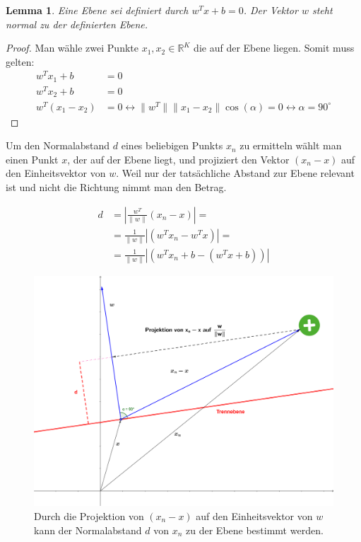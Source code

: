 \documentclass[a4paper,11pt,twoside]{scrreprt}
\newtheorem{lemma}[theorem]{Lemma}
\newcommand{\norm}[1]{\lVert#1\rVert}
\begin{document}
\begin{lemma}
	Eine Ebene sei definiert durch $w^{T} x + b = 0$. Der Vektor $w$ steht normal zu der definierten Ebene.
\end{lemma}

\begin{proof}
	Man wähle zwei Punkte $x_{1}, x_{2} \in \mathbb{R}^{K}$ die auf der Ebene liegen. Somit muss gelten:
	\begin{equation}
		\begin{aligned}
			w^{T} x_{1} + b &= 0 \\
			w^{T} x_{2} + b &= 0 \\
			w^{T} (x_{1} - x_{2}) &= 0 \leftrightarrow \norm{w^{T}} \norm{x_{1} - x_{2}} \cos(\alpha) = 0 \leftrightarrow \alpha = 90^{\circ}
		\end{aligned}
	\end{equation}
\end{proof}

Um den Normalabstand $d$ eines beliebigen Punkts $x_{n}$ zu ermitteln wählt man einen Punkt $x$, der auf der Ebene liegt, und projiziert den Vektor $(x_{n} - x)$ auf den Einheitsvektor von $w$. Weil nur der tatsächliche Abstand zur Ebene relevant ist und nicht die Richtung nimmt man den Betrag.

\begin{equation} \label{distance_to_plane}
	\begin{aligned}
		d &= | \frac{w^{T}}{\lVert w \rVert} (x_{n} - x) | = \\
		&= \frac{1}{\norm{w}} | (w^{T} x_{n} - w^{T} x) | =\\
		&= \frac{1}{\norm{w}} | (w^{T} x_{n} + b - (w^{T} x + b)) |
	\end{aligned}
\end{equation}

\begin{figure}[H]
	\centering
	\includegraphics[width = 13cm]{assets/projection.png}
	\caption{Durch die Projektion von $(x_{n} - x)$ auf den Einheitsvektor von $w$ kann der Normalabstand $d$ von $x_{n}$ zu der Ebene bestimmt werden.}
	\label{fig:projection}
\end{figure}
\end{document}
